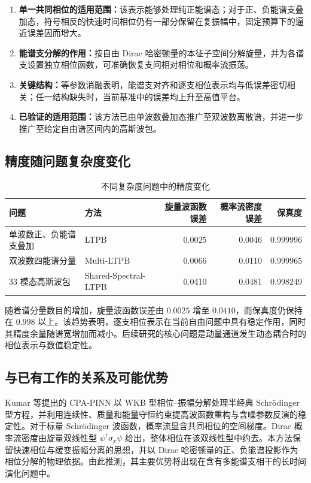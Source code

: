 \documentclass[UTF8,a4paper,12pt,fontset=fandol]{ctexart}
\begin{document}
\begin{enumerate}
  \item \textbf{单一共同相位的适用范围：}该表示能够处理纯正能谱态；对于正、负能谱支叠加态，符号相反的快速时间相位仍有一部分保留在复振幅中，固定预算下的逼近误差因而增大。
  \item \textbf{能谱支分解的作用：}按自由 Dirac 哈密顿量的本征子空间分解旋量，并为各谱支设置独立相位函数，可准确恢复支间相对相位和概率流振荡。
  \item \textbf{关键结构：}等参数消融表明，能谱支对齐和逐支相位表示均与低误差密切相关；任一结构缺失时，当前基准中的误差均上升至高值平台。
  \item \textbf{已验证的适用范围：}该方法已由单波数叠加态推广至双波数离散谱，并进一步推广至给定自由谱区间内的高斯波包。
\end{enumerate}

\subsection{精度随问题复杂度变化}

\begin{table}[htbp]
\centering
\small
\caption{不同复杂度问题中的精度变化}
\begin{tabularx}{\textwidth}{@{}Y Y r r r@{}}
\toprule
问题 & 方法 & 旋量波函数误差 & 概率流密度误差 & 保真度 \\
\midrule
单波数正、负能谱支叠加 & LTPB & 0.0025 & 0.0046 & 0.999996 \\
双波数四能谱分量 & Multi-LTPB & 0.0066 & 0.0110 & 0.999965 \\
33 模态高斯波包 & Shared-Spectral-LTPB & 0.0410 & 0.0481 & 0.998249 \\
\bottomrule
\end{tabularx}
\end{table}

随着谱分量数目的增加，旋量波函数误差由 $0.0025$ 增至 $0.0410$，而保真度仍保持在 $0.998$ 以上。该趋势表明，逐支相位表示在当前自由问题中具有稳定作用，同时其精度余量随谱宽增加而减小。后续研究的核心问题是动量通道发生动态耦合时的相位表示与数值稳定性。

\subsection{与已有工作的关系及可能优势}

Kumar 等提出的 CPA-PINN 以 WKB 型相位--振幅分解处理半经典 Schrödinger 型方程，并利用连续性、质量和能量守恒约束提高波函数重构与含噪参数反演的稳定性\cite{kumar2026}。对于标量 Schrödinger 波函数，概率流显含共同相位的空间梯度。Dirac 概率流密度由旋量双线性型 $\psi^\dagger\sigma_x\psi$ 给出，整体相位在该双线性型中约去。本方法保留快速相位与缓变振幅分离的思想，并以 Dirac 哈密顿量的正、负能谱投影作为相位分解的物理依据。由此推测，其主要优势将出现在含有多能谱支相干的长时间演化问题中。
\end{document}
